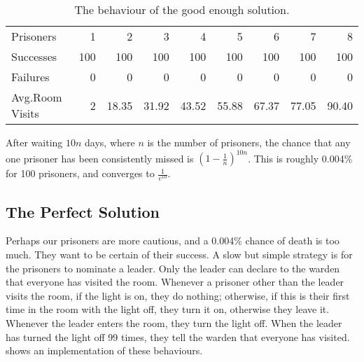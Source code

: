 \begin{table}
  \centering
  \begin{tabular}{l|rrrrrrrr} \toprule
    Prisoners          &   1 &   2    &   3    &   4    &   5    &   6    &   7    &   8 \\
    Successes          & 100 & 100    & 100    & 100    & 100    & 100    & 100    & 100 \\
    Failures           &   0 &   0    &   0    &   0    &   0    &   0    &   0    &   0 \\
    Avg.\@ Room Visits &   2 &  18.35 &  31.92 &  43.52 &  55.88 &  67.37 &  77.05 &  90.40 \\ \bottomrule
  \end{tabular}
  \caption{The behaviour of the good enough solution.}\label{tbl:100rand}
\end{table}

After waiting $10 n$ days, where $n$ is the number of prisoners, the
chance that any one prisoner has been consistently missed is
$\left(1 - \frac{1}{n}\right)^{10n}$.  This is roughly 0.004\% for 100
prisoners, and converges to $\frac{1}{e^{10}}$.

\subsection{The Perfect Solution}

Perhaps our prisoners are more cautious, and a 0.004\% chance of death
is too much.  They want to be certain of their success.  A slow but
simple strategy is for the prisoners to nominate a leader.  Only the
leader can declare to the warden that everyone has visited the room.
Whenever a prisoner other than the leader visits the room, if the
light is on, they do nothing; otherwise, if this is their first time
in the room with the light off, they turn it on, otherwise they leave
it.  Whenever the leader enters the room, they turn the light off.
When the leader has turned the light off 99 times, they tell the
warden that everyone has visited.   shows an
implementation of these behaviours.

